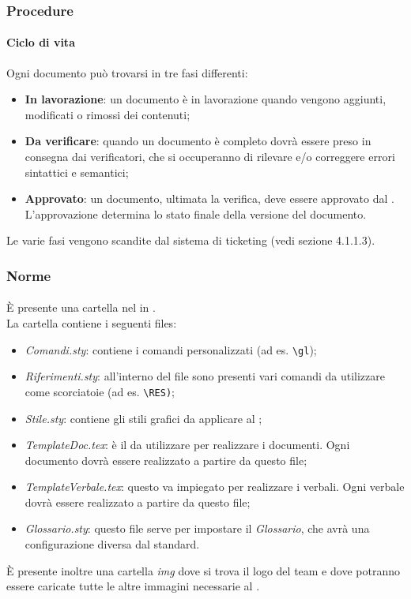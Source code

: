\subsubsection{Procedure}
\label{sec:3.1.1}
	\paragraph{Ciclo di vita}
	\label{sec:3.1.1.1}
		Ogni documento può trovarsi in tre fasi differenti:
		\begin{itemize}
			\item \textbf{In lavorazione}: un documento è in lavorazione quando vengono aggiunti, modificati o rimossi dei contenuti;
			\item \textbf{Da verificare}: quando un documento è completo dovrà essere preso in consegna dai verificatori, che si occuperanno di rilevare e/o correggere errori sintattici e semantici;
			\item \textbf{Approvato}: un documento, ultimata la verifica, deve essere approvato dal \RES. L'approvazione determina lo stato finale della versione del documento.
		\end{itemize}
		Le varie fasi vengono scandite dal sistema di ticketing (vedi sezione 4.1.1.3).
\subsubsection{Norme}
\label{sec:3.1.2}
	\paragraph{}
	\label{sec:3.1.2.1}
		È presente una cartella nel  in . \\
		La cartella contiene i seguenti files:
		\begin{itemize}
			\item \textit{Comandi.sty}: contiene i comandi personalizzati (ad es. \texttt {\textbackslash gl});
			\item \textit{Riferimenti.sty}: all'interno del file sono presenti vari comandi da utilizzare come scorciatoie (ad es. \texttt{\textbackslash RES)};
			\item \textit{Stile.sty}: contiene gli stili grafici da applicare al ;
			\item \textit{TemplateDoc.tex}: è il  da utilizzare per realizzare i documenti. Ogni documento dovrà essere realizzato a partire da questo file;
			\item \textit{TemplateVerbale.tex}: questo  va impiegato per realizzare i verbali. Ogni verbale dovrà essere realizzato a partire da questo file;
			\item \textit{Glossario.sty}: questo file serve per impostare il \textit{Glossario}, che avrà una configurazione diversa dal  standard. %
		\end{itemize}
		È presente inoltre una cartella \textit{img} dove si trova il logo del team e dove potranno essere caricate tutte le altre immagini necessarie al . 
